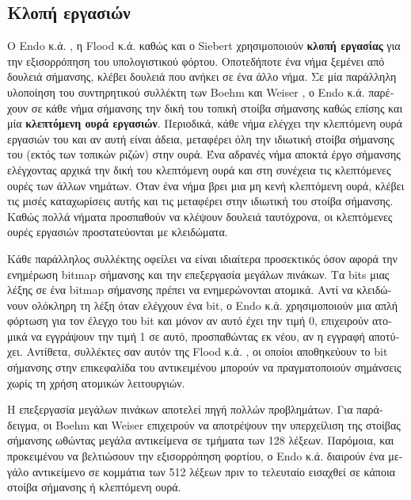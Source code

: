 \begin{greek}
\subsection{Κλοπή εργασιών}
Ο Endo κ.ά. \cite{DBLP:conf/sc/EndoTY97}, η Flood κ.ά. \cite{DBLP:conf/jvm/FloodDSZ01}
καθώς και ο Siebert \cite{DBLP:conf/iwmm/Siebert10} χρησιμοποιούν 
\textbf{κλοπή εργασίας} για την εξισορρόπηση
του υπολογιστικού φόρτου. Οποτεδήποτε ένα νήμα ξεμένει από
δουλειά σήμανσης, κλέβει δουλειά που ανήκει σε ένα άλλο νήμα.
Σε μία παράλληλη υλοποίηση του συντηρητικού συλλέκτη των Boehm
και Weiser \cite{DBLP:journals/spe/BoehmW88}, ο Endo κ.ά. παρέχουν
σε κάθε νήμα σήμανσης την δική του τοπική στοίβα σήμανσης καθώς
επίσης και μία \textbf{κλεπτόμενη ουρά εργασιών}. Περιοδικά,
κάθε νήμα ελέγχει την κλεπτόμενη ουρά εργασιών του και αν αυτή
είναι άδεια, μεταφέρει όλη την ιδιωτική στοίβα σήμανσης του (εκτός
των τοπικών ριζών) στην ουρά. Ένα αδρανές νήμα αποκτά έργο σήμανσης
ελέγχοντας αρχικά την δική του κλεπτόμενη ουρά και στη συνέχεια
τις κλεπτόμενες ουρές των άλλων νημάτων. Όταν ένα νήμα βρει μια
μη κενή κλεπτόμενη ουρά, κλέβει τις μισές καταχωρίσεις αυτής
και τις μεταφέρει στην ιδιωτική του στοίβα σήμανσης. Καθώς πολλά
νήματα προσπαθούν να κλέψουν δουλειά ταυτόχρονα, οι κλεπτόμενες
ουρές εργασιών προστατεύονται με κλειδώματα. 

Κάθε παράλληλος συλλέκτης οφείλει να είναι ιδιαίτερα προσεκτικός
όσον αφορά την ενημέρωση bitmap σήμανσης και την επεξεργασία
μεγάλων πινάκων. Τα bits μιας λέξης σε ένα bitmap σήμανσης πρέπει
να ενημερώνονται ατομικά. Αντί να κλειδώνουν ολόκληρη τη λέξη
όταν ελέγχουν ένα bit, ο Endo κ.ά. χρησιμοποιούν μια απλή φόρτωση
για τον έλεγχο του bit και μόνον αν αυτό έχει την τιμή 0, επιχειρούν
ατομικά να εγγράψουν την τιμή 1 σε αυτό, προσπαθώντας εκ νέου,
αν η εγγραφή αποτύχει. Αντίθετα, συλλέκτες σαν αυτόν της Flood
κ.ά. \cite{DBLP:conf/jvm/FloodDSZ01}, οι οποίοι αποθηκεύουν το
bit σήμανσης στην επικεφαλίδα του αντικειμένου μπορούν να
πραγματοποιούν σημάνσεις χωρίς τη χρήση ατομικών λειτουργιών.

Η επεξεργασία μεγάλων πινάκων αποτελεί πηγή πολλών προβλημάτων.
Για παράδειγμα, οι Boehm και Weiser \cite{DBLP:journals/spe/BoehmW88}
επιχειρούν να αποτρέψουν την υπερχείλιση της στοίβας σήμανσης
ωθώντας μεγάλα αντικείμενα σε τμήματα των 128 λέξεων. Παρόμοια,
και προκειμένου να βελτιώσουν την εξισορρόπηση φορτίου, ο Endo
κ.ά. διαιρούν ένα μεγάλο αντικείμενο σε κομμάτια των 512 λέξεων 
πριν το τελευταίο εισαχθεί σε κάποια στοίβα σήμανσης ή κλεπτόμενη 
ουρά.


\end{greek}
